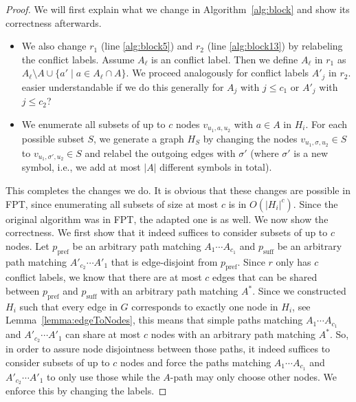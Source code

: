 \documentclass[a4paper,english]{lipics-v2016}
\theoremstyle{plain}
\newcommand{\tina}[1]{#1}
\begin{document}
\begin{proof}
We will first explain what we change in Algorithm~\ref{alg:block} and show its correctness afterwards.
\begin{itemize}
\item We also change $r_1$ (line \ref{alg:block5}) and $r_2$ (line \ref{alg:block13}) by relabeling the conflict labels. Assume $A_\ell$ is an conflict label. Then we define $A_\ell$ in $r_1$ as $A_\ell \setminus A \cup \{a' \mid a \in A_\ell \cap A\}$. We proceed analogously for conflict labels $A'_j$ in $r_2$. \tina{easier understandable if we do this generally for $A_j$ with $j \leq c_1$ or $A'_j$ with $j \leq c_2$?}
\item We enumerate all subsets of up to $c$ nodes $v_{u_1,a,u_2}$ with $a \in A$ in $H_i$. For each possible subset $S$, we generate a graph $H_S$ by changing the nodes $v_{u_1,\sigma,u_2} \in S$ to $v_{u_1,\sigma',u_2} \in S$ and relabel the outgoing edges with $\sigma'$ (where $\sigma'$ is a new symbol, i.e., we add at most $|A|$ different symbols in total). 
\end{itemize}
This completes the changes we do. It is obvious that these changes are possible in FPT, since enumerating all subsets of size at most $c$ is in $O(|H_i|^c)$. Since the original algorithm was in FPT, the adapted one is as well.
We now show the correctness.
We first show that it indeed suffices to consider subsets of up to $c$ nodes.
Let $p_\text{pref}$ be an arbitrary path matching $A_1 \cdots A_{c_1}$ and $p_\text{suff}$ be an arbitrary path matching $A'_{c_2}\cdots A'_{1}$ that is edge-disjoint from $p_\text{pref}$.
Since $r$ only has $c$ conflict labels, we know that there are at most $c$ edges that can be shared between $p_\text{pref}$ and $p_\text{suff}$ with an arbitrary path matching $A^*$. Since we constructed $H_i$ such that every edge in $G$ corresponds to exactly one node in $H_i$, see Lemma~\ref{lemma:edgeToNodes}, this means that simple paths matching $A_1 \cdots A_{c_1}$ and $A'_{c_2}\cdots A'_{1}$ can share at most $c$ nodes with an arbitrary path matching $A^*$.
So, in order to assure node disjointness between those paths, it indeed suffices to consider subsets of up to $c$ nodes and force the paths matching $A_1 \cdots A_{c_1}$ and $A'_{c_2}\cdots A'_{1}$ to only use those while the $A$-path may only choose other nodes. We enforce this by changing the labels. 



\end{proof}
\end{document}

